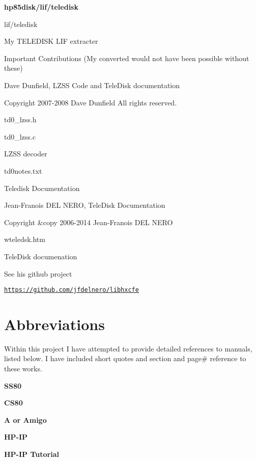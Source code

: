 {\bfseries hp85disk/lif/teledisk }
\begin{DoxyItemize}
\item lif/teledisk
\begin{DoxyItemize}
\item My T\+E\+L\+E\+D\+I\+SK L\+IF extracter
\item Important Contributions (My converted would not have been possible without these)
\begin{DoxyItemize}
\item Dave Dunfield, L\+Z\+SS Code and Tele\+Disk documentation
\begin{DoxyItemize}
\item Copyright 2007-\/2008 Dave Dunfield All rights reserved.
\item td0\+\_\+lzss.\+h
\item td0\+\_\+lzss.\+c
\begin{DoxyItemize}
\item L\+Z\+SS decoder
\end{DoxyItemize}
\item td0notes.\+txt
\begin{DoxyItemize}
\item Teledisk Documentation
\end{DoxyItemize}
\end{DoxyItemize}
\item Jean-\/\+Franois D\+EL N\+E\+RO, Tele\+Disk Documentation
\begin{DoxyItemize}
\item Copyright \&copy 2006-\/2014 Jean-\/\+Franois D\+EL N\+E\+RO
\begin{DoxyItemize}
\item wteledsk.\+htm
\begin{DoxyItemize}
\item Tele\+Disk documenation
\end{DoxyItemize}
\item See his github project
\begin{DoxyItemize}
\item \href{https://github.com/jfdelnero/libhxcfe}{\tt https\+://github.\+com/jfdelnero/libhxcfe} 

 \section*{Abbreviations}
\end{DoxyItemize}

Within this project I have attempted to provide detailed references to manuals, listed below. I have included short quotes and section and page\# reference to these works.
\end{DoxyItemize}
\end{DoxyItemize}
\end{DoxyItemize}
\end{DoxyItemize}
\item {\bfseries S\+S80}
\item {\bfseries C\+S80}
\item {\bfseries A or Amigo}
\item {\bfseries H\+P-\/\+IP}
\item {\bfseries H\+P-\/\+IP Tutorial}
\end{DoxyItemize}
